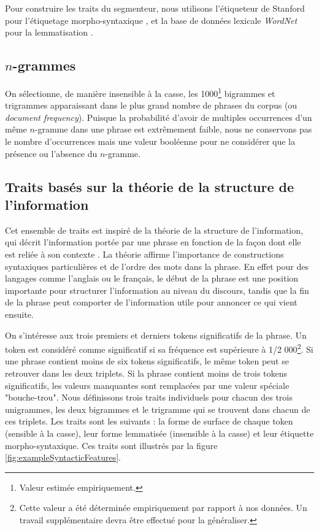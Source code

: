 Pour construire les traits du segmenteur, nous utilisons l'étiqueteur de Stanford pour l'étiquetage morpho-syntaxique \cite{toutanova2003feature}, et la base de données lexicale \textit{WordNet} pour la lemmatisation \cite{miller1995wordnet}.

\subsection{$n$-grammes}

On sélectionne, de manière insensible à la casse, les 1000\footnote{Valeur estimée empiriquement.} bigrammes et trigrammes apparaissant dans le plus grand nombre de phrases du corpus (ou \textit{document frequency}). Puisque la probabilité d'avoir de multiples occurrences d'un même $n$-gramme dans une phrase est extrêmement faible, nous ne conservons pas le nombre d'occurrences mais une valeur booléenne pour ne considérer que la présence ou l'absence du $n$-gramme.

\subsection{Traits basés sur la théorie de la structure de l'information}

Cet ensemble de traits est inspiré de la théorie de la structure de l'information, qui décrit l'information portée par une phrase en fonction de la façon dont elle est reliée à son contexte \cite{kruijff:1996}. La théorie affirme l'importance de constructions syntaxiques particulières et de l'ordre des mots dans la phrase. En effet pour des langages comme l'anglais ou le français, le début de la phrase est une position importante pour structurer l'information au niveau du discours, tandis que la fin de la phrase peut comporter de l'information utile pour annoncer ce qui vient ensuite. 

On s'intéresse aux trois premiers et derniers tokens significatifs de la phrase. Un token est considéré comme significatif si sa fréquence est supérieure à 1/2 000\footnote{Cette valeur a été déterminée empiriquement par rapport à nos données. Un travail supplémentaire devra être effectué pour la généraliser.}. Si une phrase contient moins de six tokens significatifs, le même token peut se retrouver dans les deux triplets. Si la phrase contient moins de trois tokens significatifs, les valeurs manquantes sont remplacées par une valeur spéciale "bouche-trou". Nous définissons trois traits individuels pour chacun des trois unigrammes, les deux bigrammes et le trigramme qui se trouvent dans chacun de ces triplets. Les traits sont les suivants : la forme de surface de chaque token (sensible à la casse), leur forme lemmatisée (insensible à la casse) et leur étiquette morpho-syntaxique. Ces traits sont illustrés par la figure \ref{fig:exampleSyntacticFeatures}.

